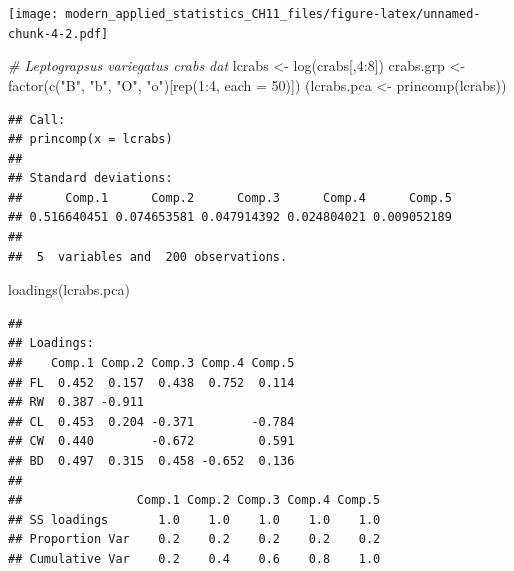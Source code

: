\documentclass[
]{article}
\newenvironment{Shaded}{\begin{snugshade}}{\end{snugshade}}
\newcommand{\AttributeTok}[1]{\textcolor[rgb]{0.77,0.63,0.00}{#1}}
\newcommand{\CommentTok}[1]{\textcolor[rgb]{0.56,0.35,0.01}{\textit{#1}}}
\newcommand{\DecValTok}[1]{\textcolor[rgb]{0.00,0.00,0.81}{#1}}
\newcommand{\FunctionTok}[1]{\textcolor[rgb]{0.00,0.00,0.00}{#1}}
\newcommand{\NormalTok}[1]{#1}
\newcommand{\OtherTok}[1]{\textcolor[rgb]{0.56,0.35,0.01}{#1}}
\newcommand{\SpecialCharTok}[1]{\textcolor[rgb]{0.00,0.00,0.00}{#1}}
\newcommand{\StringTok}[1]{\textcolor[rgb]{0.31,0.60,0.02}{#1}}
\begin{document}
\texttt{[image: modern\_applied\_statistics\_CH11\_files/figure-latex/unnamed-chunk-4-2.pdf]}

\begin{Shaded}
\begin{Highlighting}[]
\CommentTok{\# Leptograpsus variegatus crabs dat}
\NormalTok{lcrabs }\OtherTok{\textless{}{-}} \FunctionTok{log}\NormalTok{(crabs[,}\DecValTok{4}\SpecialCharTok{:}\DecValTok{8}\NormalTok{])}
\NormalTok{crabs.grp }\OtherTok{\textless{}{-}} \FunctionTok{factor}\NormalTok{(}\FunctionTok{c}\NormalTok{(}\StringTok{"B"}\NormalTok{, }\StringTok{"b"}\NormalTok{, }\StringTok{"O"}\NormalTok{, }\StringTok{"o"}\NormalTok{)[}\FunctionTok{rep}\NormalTok{(}\DecValTok{1}\SpecialCharTok{:}\DecValTok{4}\NormalTok{, }\AttributeTok{each =} \DecValTok{50}\NormalTok{)])}
\NormalTok{(lcrabs.pca }\OtherTok{\textless{}{-}} \FunctionTok{princomp}\NormalTok{(lcrabs))}
\end{Highlighting}
\end{Shaded}

\begin{verbatim}
## Call:
## princomp(x = lcrabs)
## 
## Standard deviations:
##      Comp.1      Comp.2      Comp.3      Comp.4      Comp.5 
## 0.516640451 0.074653581 0.047914392 0.024804021 0.009052189 
## 
##  5  variables and  200 observations.
\end{verbatim}

\begin{Shaded}
\begin{Highlighting}[]
\FunctionTok{loadings}\NormalTok{(lcrabs.pca)}
\end{Highlighting}
\end{Shaded}

\begin{verbatim}
## 
## Loadings:
##    Comp.1 Comp.2 Comp.3 Comp.4 Comp.5
## FL  0.452  0.157  0.438  0.752  0.114
## RW  0.387 -0.911                     
## CL  0.453  0.204 -0.371        -0.784
## CW  0.440        -0.672         0.591
## BD  0.497  0.315  0.458 -0.652  0.136
## 
##                Comp.1 Comp.2 Comp.3 Comp.4 Comp.5
## SS loadings       1.0    1.0    1.0    1.0    1.0
## Proportion Var    0.2    0.2    0.2    0.2    0.2
## Cumulative Var    0.2    0.4    0.6    0.8    1.0
\end{verbatim}
\end{document}

